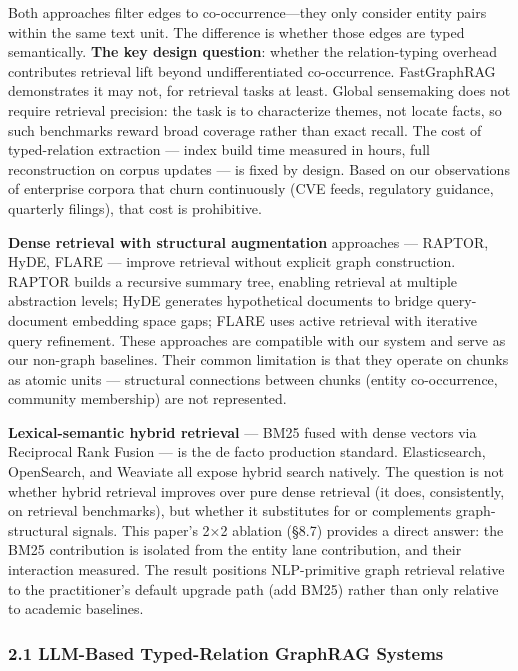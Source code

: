Both approaches filter edges to co-occurrence---they only consider entity pairs within the same text unit. The difference is whether those edges are typed semantically. \textbf{The key design question}: whether the relation-typing overhead contributes retrieval lift beyond undifferentiated co-occurrence. FastGraphRAG demonstrates it may not, for retrieval tasks at least. Global sensemaking does not require retrieval precision: the task is to characterize themes, not locate facts, so such benchmarks reward broad coverage rather than exact recall. The cost of typed-relation extraction --- index build time measured in hours, full reconstruction on corpus updates --- is fixed by design. Based on our observations of enterprise corpora that churn continuously (CVE feeds, regulatory guidance, quarterly filings), that cost is prohibitive.

\textbf{Dense retrieval with structural augmentation} approaches --- RAPTOR, HyDE, FLARE --- improve retrieval without explicit graph construction. RAPTOR builds a recursive summary tree, enabling retrieval at multiple abstraction levels; HyDE generates hypothetical documents to bridge query-document embedding space gaps; FLARE uses active retrieval with iterative query refinement. These approaches are compatible with our system and serve as our non-graph baselines. Their common limitation is that they operate on chunks as atomic units --- structural connections between chunks (entity co-occurrence, community membership) are not represented.

\textbf{Lexical-semantic hybrid retrieval} --- BM25 fused with dense vectors via Reciprocal Rank Fusion --- is the de facto production standard. Elasticsearch, OpenSearch, and Weaviate all expose hybrid search natively. The question is not whether hybrid retrieval improves over pure dense retrieval (it does, consistently, on retrieval benchmarks), but whether it substitutes for or complements graph-structural signals. This paper's 2×2 ablation (§8.7) provides a direct answer: the BM25 contribution is isolated from the entity lane contribution, and their interaction measured. The result positions NLP-primitive graph retrieval relative to the practitioner's default upgrade path (add BM25) rather than only relative to academic baselines.

\subsubsection{2.1 LLM-Based Typed-Relation GraphRAG Systems}\label{llm-based-typed-relation-graphrag-systems}


